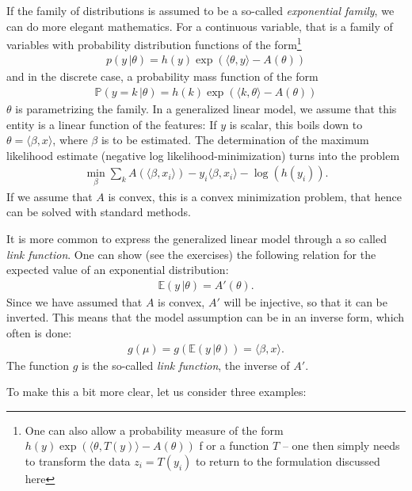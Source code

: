 \documentclass{article}
\newcommand{\erw}{\mathbb{E}} %
\newcommand{\sprod}[1]{\langle #1 \rangle}
\begin{document}
If the family of distributions is assumed to be a so-called \emph{exponential family}, we can do more elegant mathematics. For a continuous variable, that is a family of variables with probability distribution functions of the form\footnote{One can also allow a probability measure of the form $h(y) \exp(\sprod{\theta,T(y)} - A(\theta)) $ f or a function $T$ -- one then simply needs to transform the data $z_i=T(y_i)$ to return to the formulation discussed here}
\begin{align*}
    p(y \, \vert \theta ) = h(y) \exp(\sprod{\theta,y} - A(\theta))
\end{align*}
and in the discrete case, a probability mass function of the form
\begin{align} 
    \mathbb{P}(y=k \, \vert \theta) =  h(k) \exp(\sprod{k,\theta} - A(\theta))
\end{align}
$\theta$ is parametrizing the family. In a generalized linear model, we assume that this entity is a linear function of the features: If $y$ is scalar, this boils down to $\theta=\sprod{\beta, x}$, where $\beta$ is to be estimated. The determination of the maximum likelihood estimate (negative log likelihood-minimization) turns into the problem
\begin{align} \label{eq:maxlikelihood}
    \min_\beta \sum_k A(\sprod{\beta,x_i})-y_i\sprod{\beta,x_i} - \log(h(y_i)).
\end{align}
If we assume that $A$ is convex, this is a convex minimization problem, that hence can be solved with standard methods.

It is more common to express the generalized linear model through a so called \emph{link function}. One can show (see the exercises) the following relation for the expected value of an exponential distribution:
\begin{align}
     \erw(y \, \vert \theta) = A'(\theta). \label{eq:mean}
\end{align}
Since we have assumed that $A$ is convex, $A'$ will be injective, so that it can be inverted. This means that the model assumption can be in an inverse form, which often is done:
\begin{align*}
    g(\mu) = g( \erw(y \, \vert \theta)) = \sprod{\beta,x}.
\end{align*}
The function $g$ is the so-called \emph{link function}, the inverse of $A'$.

To make this a bit more clear, let us consider three examples:
\end{document}
